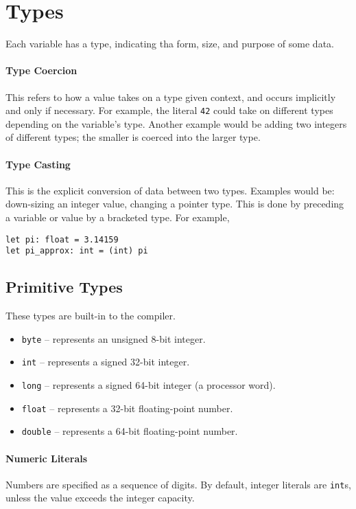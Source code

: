 \documentclass{article}
\begin{document}
\section{Types}

Each variable has a type, indicating tha form, size, and purpose of some data.

\paragraph*{Type Coercion}
This refers to how a value takes on a type given context, and occurs implicitly and only if necessary.
For example, the literal \texttt{42} could take on different types depending on the variable's type.
Another example would be adding two integers of different types; the smaller is coerced into the larger type.

\paragraph*{Type Casting}
This is the explicit conversion of data between two types.
Examples would be: down-sizing an integer value, changing a pointer type.
This is done by preceding a variable or value by a bracketed type.
For example,

\begin{lstlisting}[language=CustomLang]
let pi: float = 3.14159
let pi_approx: int = (int) pi
\end{lstlisting}

\subsection{Primitive Types}

These types are built-in to the compiler.

\begin{itemize}
    \item \texttt{byte} -- represents an unsigned 8-bit integer.
    \item \texttt{int} -- represents a signed 32-bit integer.
    \item \texttt{long} -- represents a signed 64-bit integer (a processor word).
    \item \texttt{float} -- represents a 32-bit floating-point number.
    \item \texttt{double} -- represents a 64-bit floating-point number.
\end{itemize}

\paragraph*{Numeric Literals}
Numbers are specified as a sequence of digits.
By default, integer literals are \texttt{int}s, unless the value exceeds the integer capacity.
\end{document}
